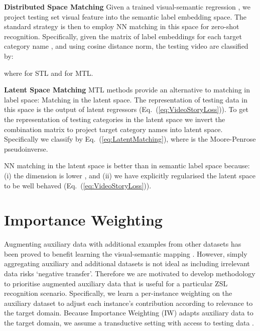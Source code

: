 \documentclass[runningheads]{llncs}
\begin{document}
\noindent\textbf{Distributed Space Matching}\quad
Given a trained visual-semantic regression , we project testing set visual feature  into the semantic label embedding space. The standard strategy \cite{Xu2015,Fu2015,dinu2014improving} is then to employ NN matching in this space for zero-shot recognition. Specifically, given the matrix of label embeddings for each target category name , and using cosine distance norm, the testing video  are classified by:





\noindent where  for STL and  for MTL.

\noindent\textbf{Latent Space Matching}\quad
MTL methods provide an alternative to matching in label space:
Matching in the latent space. The representation of testing data
in this space is the output of latent regressors
 (Eq.~(\ref{eq:VideoStoryLoss})). To get the
representation of testing categories in the latent space we invert the
combination matrix  to project target category names  into
latent space. Specifically we classify by Eq.~(\ref{eq:LatentMatching}), where
 is the Moore-Penrose pseudoinverse. 




\noindent NN matching in the latent space is better than in semantic label space because: (i) the dimension is lower , and (ii) we have explicitly regularised the latent space to be well behaved (Eq.~(\ref{eq:VideoStoryLoss})).



\section{Importance Weighting}\label{sect:ImportanceWeighting}



Augmenting auxiliary data with additional examples from other datasets has been proved to benefit learning the visual-semantic mapping \cite{Xu2015}.
However, simply aggregating auxiliary and additional datasets is not ideal as including irrelevant data risks `negative transfer'. Therefore we are motivated to develop methodology to prioritise augmented auxiliary data that is useful for a particular ZSL recognition scenario.  Specifically, we  learn a per-instance weighting  on the auxiliary dataset  to adjust each instance's contribution according to relevance to the target domain. 
Because Importance Weighting (IW) adapts auxiliary data to the target domain, we assume a transductive setting with access to testing data .
\end{document}
